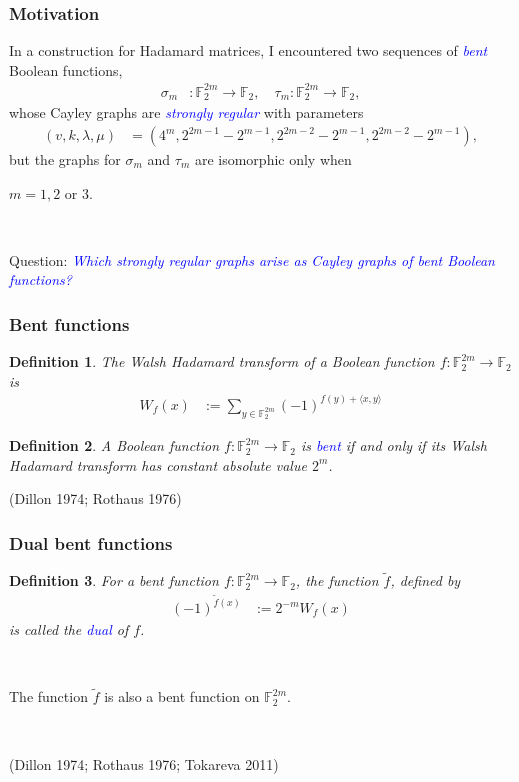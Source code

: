 \documentclass[pdf,sprung,slideColor,nocolorBG]{beamer}
\newenvironment{colortheme}[1]{
\def\ProvidesPackageRCS $##1${\relax}
\renewcommand{\ProcessOptions}{\relax}
\makeatletter

\makeatother
}{}
\newcommand{\slidecite}[1]{\tiny{(#1)}\normalsize{}}
\newcommand{\mb}[1]{\mathbb{#1}}
\newcommand{\Emph}[1]{\emph{\textcolor{blue}{#1}}}
\newcommand{\To}{\rightarrow}
\newcommand{\dual}[1]{\widetilde{#1}}
\newcommand{\F}{\mb{F}}
\newtheorem{Def}{Definition}
\begin{document}
\begin{colortheme}{jubata}

\begin{frame}
\frametitle{Motivation}

In a construction for Hada\-mard matrices, I encountered
two sequences of \Emph{bent} Boolean functions,
\begin{align*}
\sigma_m &: \F_2^{2m} \To \F_2, \quad \tau_m : \F_2^{2m} \To \F_2,
\end{align*}
whose Cayley graphs are \Emph{strongly regular} with parameters
\begin{align*}
(v,k,\lambda,\mu) &= (4^m, 2^{2 m - 1} - 2^{m-1}, 2^{2 m - 2} - 2^{m-1}, 2^{2 m - 2} - 2^{m-1}),
\end{align*}
but the graphs for $\sigma_m$ and $\tau_m$ are isomorphic only when

$m=1,2$ or $3.$

~

Question: \Emph{Which strongly regular graphs arise as Cayley graphs of bent Boolean functions?}
\end{frame}
\end{colortheme}

\begin{colortheme}{seagull}

\begin{frame}
\frametitle{Bent functions}
\begin{Def}
\label{def-Walsh-Hadamard-transform}
The Walsh Hadamard transform of
a Boolean function $f : \F_2^{2m} \To \F_2$ is
\begin{align*}
W_f(x)
&:=
\sum_{y \in \F_2^{2m}} (-1)^{f(y) + \langle x, y \rangle}
\end{align*}
\end{Def}

\begin{Def}
\label{def-Bent-function}
A Boolean function $f : \F_2^{2m} \To \F_2$ is \Emph{bent}
if and only if its Walsh Hada\-mard transform has constant absolute value $2^{m}$.
\end{Def}
\slidecite{Dillon 1974; Rothaus 1976}
\end{frame}
\begin{frame}
\frametitle{Dual bent functions}

\begin{Def}
\label{def-dual-Bent-function}
For a bent function  $f : \F_2^{2m} \To \F_2$, the function $\dual{f}$, defined by
\begin{align*}
(-1)^{\dual{f}(x)} &:= 2^{-m} W_f(x)
\end{align*}
is called the \Emph{dual} of $f$.
\end{Def}

~

The function $\dual{f}$ is also a bent function on $\F_2^{2m}$.

~

\slidecite{Dillon 1974; Rothaus 1976; Tokareva 2011}
\end{frame}

\end{colortheme}
\end{document}
